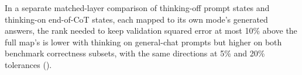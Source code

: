 In a separate matched-layer comparison of thinking-off prompt states and thinking-on end-of-CoT states, each mapped to its own mode's generated answers, the rank needed to keep validation squared error at most 10\% above the full map's is lower with thinking on general-chat prompts but higher on both benchmark correctness subsets, with the same directions at 5\% and 20\% tolerances ().
